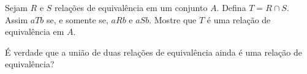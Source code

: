 \documentclass[12pt]{exam}
\begin{document}
    \vspace{.3cm}

    \questao{} Sejam $R$ e $S$ relações de equivalência em um conjunto $A$. Defina $T = R \cap S$. Assim $aTb$ se, e somente se, $aRb$ e $aSb$. Mostre que $T$ é uma relação de equivalência em $A$.

    \vspace{.3cm}

    \questao{} É verdade que a união de duas relações de equivalência ainda é uma relação de equivalência?
\end{document}
